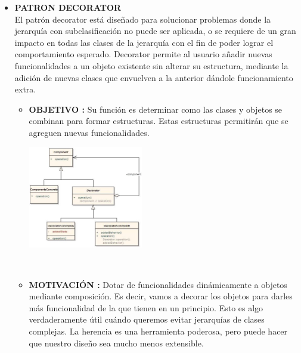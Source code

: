 \documentclass[twoside,twocolumn]{article}
\begin{document}
\begin{itemize}
    \item \textbf{PATRON DECORATOR} \\
    El patrón decorator está diseñado para solucionar problemas donde la jerarquía con subclasificación no puede ser aplicada, o se requiere de un gran impacto en todas las clases de la jerarquía con el fin de poder lograr el comportamiento esperado. Decorator permite al usuario añadir nuevas funcionalidades a un objeto existente sin alterar su estructura, mediante la adición de nuevas clases que envuelven a la anterior dándole funcionamiento extra. 
	\begin{itemize}
		\item \textbf{OBJETIVO :}	Su función es determinar como las clases y objetos se combinan para formar estructuras.
        Estas estructuras permitirán que se agreguen nuevas funcionalidades.
        
        \begin{center}
            \includegraphics[width=5cm]{./img/Imagen5.png} 
        \end{center}
        \\

		\item \textbf{MOTIVACIÓN  :} Dotar de funcionalidades dinámicamente a objetos mediante composición. Es decir, vamos a decorar los objetos para darles más funcionalidad de la que tienen en un principio.
        Esto es algo verdaderamente útil cuándo queremos evitar jerarquías de clases complejas. La herencia es una herramienta poderosa, pero puede hacer que nuestro diseño sea mucho menos extensible.
        


\end{itemize}
\end{itemize}
\end{document}
